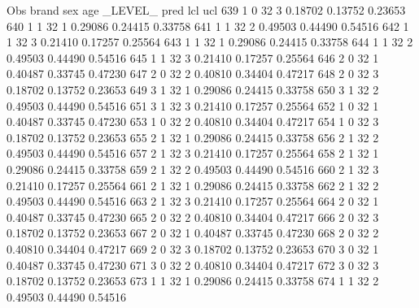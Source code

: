 \documentclass{article}
\begin{document}
\begin{Woutput}
 Obs    brand    sex    age    _LEVEL_      pred       lcl        ucl
 639      1       0      32       3       0.18702    0.13752    0.23653
 640      1       1      32       1       0.29086    0.24415    0.33758
 641      1       1      32       2       0.49503    0.44490    0.54516
 642      1       1      32       3       0.21410    0.17257    0.25564
 643      1       1      32       1       0.29086    0.24415    0.33758
 644      1       1      32       2       0.49503    0.44490    0.54516
 645      1       1      32       3       0.21410    0.17257    0.25564
 646      2       0      32       1       0.40487    0.33745    0.47230
 647      2       0      32       2       0.40810    0.34404    0.47217
 648      2       0      32       3       0.18702    0.13752    0.23653
 649      3       1      32       1       0.29086    0.24415    0.33758
 650      3       1      32       2       0.49503    0.44490    0.54516
 651      3       1      32       3       0.21410    0.17257    0.25564
 652      1       0      32       1       0.40487    0.33745    0.47230
 653      1       0      32       2       0.40810    0.34404    0.47217
 654      1       0      32       3       0.18702    0.13752    0.23653
 655      2       1      32       1       0.29086    0.24415    0.33758
 656      2       1      32       2       0.49503    0.44490    0.54516
 657      2       1      32       3       0.21410    0.17257    0.25564
 658      2       1      32       1       0.29086    0.24415    0.33758
 659      2       1      32       2       0.49503    0.44490    0.54516
 660      2       1      32       3       0.21410    0.17257    0.25564
 661      2       1      32       1       0.29086    0.24415    0.33758
 662      2       1      32       2       0.49503    0.44490    0.54516
 663      2       1      32       3       0.21410    0.17257    0.25564
 664      2       0      32       1       0.40487    0.33745    0.47230
 665      2       0      32       2       0.40810    0.34404    0.47217
 666      2       0      32       3       0.18702    0.13752    0.23653
 667      2       0      32       1       0.40487    0.33745    0.47230
 668      2       0      32       2       0.40810    0.34404    0.47217
 669      2       0      32       3       0.18702    0.13752    0.23653
 670      3       0      32       1       0.40487    0.33745    0.47230
 671      3       0      32       2       0.40810    0.34404    0.47217
 672      3       0      32       3       0.18702    0.13752    0.23653
 673      1       1      32       1       0.29086    0.24415    0.33758
 674      1       1      32       2       0.49503    0.44490    0.54516

\end{Woutput}
\end{document}
